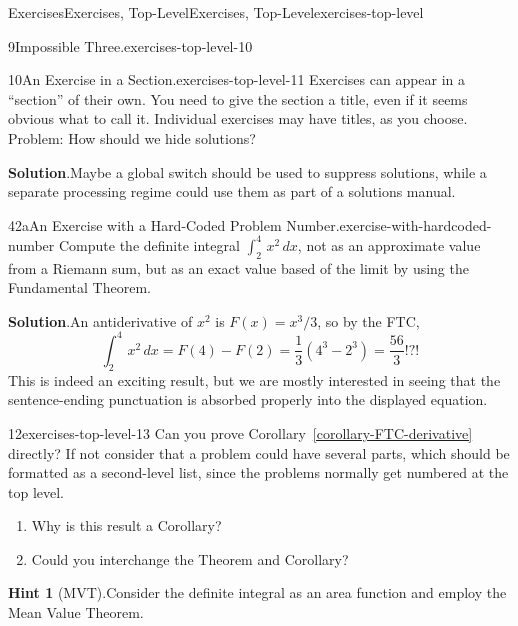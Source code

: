 \documentclass[twoside,10pt,]{article}
\newcommand{\blocktitlefont}{\relax}
\newcommand{\xreffont}{\relax}
\numberwithin{equation}{section}
\newcommand{\definiteintegral}[4]{\int_{#1}^{#2}\,#3\,d#4}
\begin{document}
\begin{exercises-section}{Exercises}{Exercises, Top-Level}{}{Exercises, Top-Level}{}{}{exercises-top-level}
\begin{divisionexercise}{9}{Impossible Three.}{}{exercises-top-level-10}
\end{divisionexercise}%
\begin{divisionexercise}{10}{An Exercise in a Section.}{}{exercises-top-level-11}%
Exercises can appear in a ``section'' of their own.  You need to give the section a title, even if it seems obvious what to call it.  Individual exercises may have titles, as you choose.  Problem: How should we hide solutions?%
\par\smallskip%
\noindent\textbf{\blocktitlefont Solution}.\hypertarget{exercises-top-level-11-3}{}\quad{}Maybe a global switch should be used to suppress solutions, while a separate processing regime could use them as part of a solutions manual.%
\end{divisionexercise}%
\begin{divisionexercise}{42a}{An Exercise with a Hard-Coded Problem Number.}{}{exercise-with-hardcoded-number}%
Compute the definite integral \(\definiteintegral{2}{4}{x^2}{x}\), not as an approximate value from a Riemann sum, but as an exact value based of the limit by using the Fundamental Theorem.%
\par\smallskip%
\noindent\textbf{\blocktitlefont Solution}.\hypertarget{solution-antiderivative}{}\quad{}An antiderivative of \(x^2\) is \(F(x)=x^3/3\), so by the FTC,%
\begin{equation*}
\definiteintegral{2}{4}{x^2}{x}=F(4)-F(2)=\frac{1}{3}\left(4^3-2^3\right)=\frac{56}{3}\text{!?!}
\end{equation*}
This is indeed an exciting result, but we are mostly interested in seeing that the sentence-ending punctuation is absorbed properly into the displayed equation.%
\end{divisionexercise}%
\begin{divisionexercise}{12}{}{}{exercises-top-level-13}%
Can you prove Corollary~\hyperref[corollary-FTC-derivative]{{\xreffont\ref{corollary-FTC-derivative}}} directly?  If not consider that a problem could have several parts, which should be formatted as a second-level list, since the problems normally get numbered at the top level.%
\begin{enumerate}[label={(\alph*)}]
\item{}Why is this result a Corollary?%
\item{}Could you interchange the Theorem and Corollary?%
\end{enumerate}
%
\par\smallskip%
\noindent\textbf{\blocktitlefont Hint 1} (MVT).\hypertarget{exercises-top-level-13-2}{}\quad{}Consider the definite integral as an area function and employ the Mean Value Theorem.%

\end{divisionexercise}
\end{exercises-section}
\end{document}
